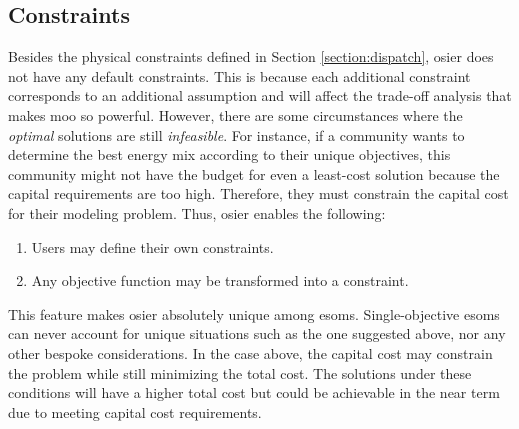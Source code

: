 \subsection{Constraints}
Besides the physical constraints defined in Section \ref{section:dispatch},
\ac{osier} does not have any default constraints. This is because each
additional constraint corresponds to an additional assumption and will affect
the trade-off analysis that makes \ac{moo} so powerful. However, there are some
circumstances where the \textit{optimal} solutions are still
\textit{infeasible}. For instance, if a community wants to determine the best
energy mix according to their unique objectives, this community might not have
the budget for even a least-cost solution because the capital requirements are
too high. Therefore, they must constrain the capital cost for their modeling
problem. Thus, \ac{osier} enables the following:
\begin{enumerate}
    \item Users may define their own constraints.
    \item Any objective function may be transformed into a constraint.
\end{enumerate}
This feature makes \ac{osier} absolutely unique among \acp{esom}.
Single-objective \acp{esom} can never account for unique situations such as the
one suggested above, nor any other bespoke considerations. In the case above,
the capital cost may constrain the problem while still minimizing the total
cost. The solutions under these conditions will have a higher total cost but
could be achievable in the near term due to meeting capital cost requirements.
